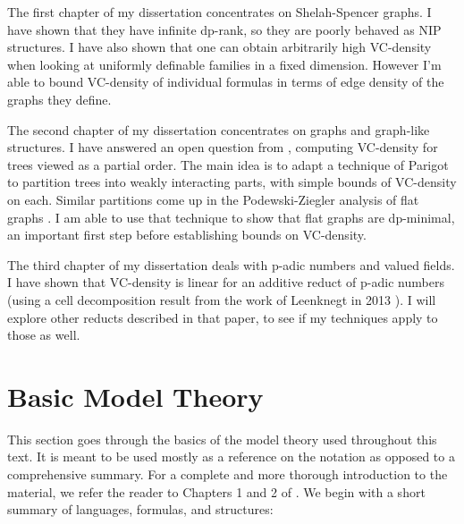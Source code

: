 The first chapter of my dissertation concentrates on Shelah-Spencer graphs.
I have shown that they have infinite dp-rank, so they are poorly behaved as NIP structures.
I have also shown that one can obtain arbitrarily high VC-density when looking at uniformly definable families in a fixed dimension.
However I'm able to bound VC-density of individual formulas in terms of edge density of the graphs they define.

The second chapter of my dissertation concentrates on graphs and graph-like structures.
I have answered an open question from \cite{density}, computing VC-density for trees viewed as a partial order.
The main idea is to adapt a technique of Parigot \cite{parigot_trees} to partition trees into weakly interacting parts, with simple bounds of VC-density on each.
Similar partitions come up in the Podewski-Ziegler analysis of flat graphs \cite {stable_graphs}.
I am able to use that technique to show that flat graphs are dp-minimal, an important first step before establishing bounds on VC-density.


The third chapter of my dissertation deals with p-adic numbers and valued fields.
I have shown that VC-density is linear for an additive reduct of p-adic numbers (using a cell decomposition result from the work of Leenknegt in 2013 \cite{reduct}).
I will explore other reducts described in that paper, to see if my techniques apply to those as well.

\section{Basic Model Theory}

This section goes through the basics of the model theory used throughout this text.
It is meant to be used mostly as a reference on the notation as opposed to a comprehensive summary.
For a complete and more thorough introduction to the material, we refer the reader to Chapters 1 and 2 of \cite{tent}.
We begin with a short summary of languages, formulas, and structures:

